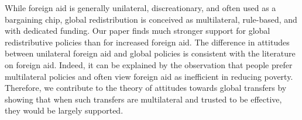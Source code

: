While foreign aid is generally unilateral, discreationary, and often used as a bargaining chip, global redistribution is conceived as multilateral, rule-based, and with dedicated funding. Our paper finds much stronger support for global redistributive policies than for increased foreign aid. The difference in attitudes between unilateral foreign aid and global policies is consistent with the literature on foreign aid. Indeed, it can be explained by the observation that people prefer multilateral policies and often view foreign aid as inefficient in reducing poverty. Therefore, we contribute to the theory of attitudes towards global transfers by showing that when such transfers are multilateral and trusted to be effective, they would be largely supported.
